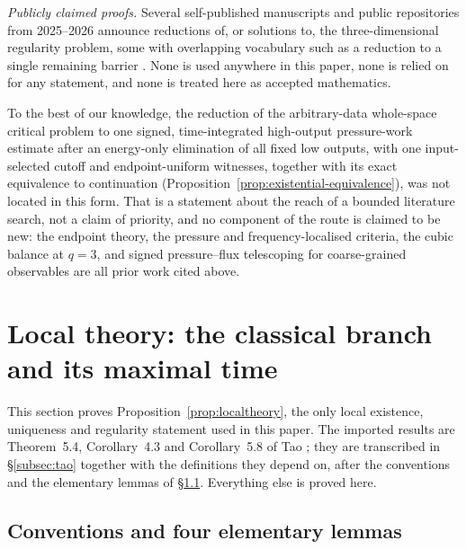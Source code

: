 \documentclass[11pt]{article}
\theoremstyle{definition}
\theoremstyle{plain}
\begin{document}
\emph{Publicly claimed proofs.}  Several self-published manuscripts and
public repositories from 2025--2026 announce reductions of, or solutions to,
the three-dimensional regularity problem, some with overlapping vocabulary
such as a reduction to a single remaining barrier \cite{Taghizadeh2026}.  None is used anywhere in this paper, none is relied
on for any statement, and none is treated here as accepted mathematics.

To the best of our knowledge, the reduction of the arbitrary-data whole-space
critical problem to one signed, time-integrated high-output pressure-work
estimate after an energy-only elimination of all fixed low outputs, with one
input-selected cutoff and endpoint-uniform witnesses, together with its exact
equivalence to continuation (Proposition~\ref{prop:existential-equivalence}),
was not located in this form.  That is a statement about the reach of a
bounded literature search, not a claim of priority, and no component of the
route is claimed to be new: the endpoint theory, the pressure and
frequency-localised criteria, the cubic balance at $q=3$, and signed
pressure--flux telescoping for coarse-grained observables are all prior work
cited above.

\section{Local theory: the classical branch and its maximal time}
\label{sec:localtheory}

This section proves Proposition~\ref{prop:localtheory}, the only local
existence, uniqueness and regularity statement used in this paper.  The
imported results are Theorem~5.4, Corollary~4.3 and Corollary~5.8 of Tao
\cite{Tao2013}; they are transcribed in \S\ref{subsec:tao} together with
the definitions they depend on, after the conventions and the elementary
lemmas of \S\ref{subsec:conventions}.  Everything else is proved here.

\subsection{Conventions and four elementary lemmas}
\label{subsec:conventions}
\end{document}
